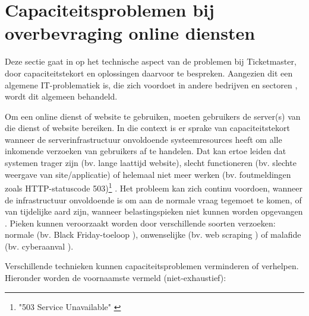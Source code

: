 
\section{Capaciteitsproblemen bij overbevraging online diensten}

Deze sectie gaat in op het technische aspect van de problemen bij Ticketmaster,
door capaciteitstekort en oplossingen daarvoor te bespreken. Aangezien dit
een algemene IT-problematiek is, die zich voordoet in andere bedrijven en
sectoren \cite{warren2023chatgpt, warren2020discord, reuters2023what},
wordt dit algemeen behandeld. 

Om een online dienst of website te gebruiken, moeten gebruikers de
server(s) van die dienst of website bereiken. In die context is er sprake van
capaciteitstekort wanneer de serverinfrastructuur onvoldoende systeemresources
heeft om alle inkomende verzoeken van gebruikers af te handelen.
Dat kan ertoe leiden dat systemen trager zijn (bv. lange laattijd website),
slecht functioneren (bv. slechte weergave van site/applicatie) of
helemaal niet meer werken (bv. foutmeldingen zoals HTTP-statuscode
503)\footnote{"503 Service Unavailable" \cite{fielding2022http}}
\cite{guitart2010survey, guitart2007designing}.
Het probleem kan zich continu voordoen, wanneer de infrastructuur onvoldoende
is om aan de normale vraag tegemoet te komen,
of van tijdelijke aard zijn, wanneer belastingspieken niet kunnen worden
opgevangen \cite{schroeder2006web}. Pieken kunnen veroorzaakt worden
door verschillende soorten verzoeken:
normale (bv. Black Friday-toeloop \cite{iyer2001overload}),
onwenselijke (bv. web scraping \cite{thelwall2006web}) of
malafide (bv. cyberaanval \cite{loukas2009protection}).

Verschillende technieken kunnen capaciteitsproblemen verminderen of
verhelpen. Hieronder worden de voornaamste vermeld (niet-exhaustief):

